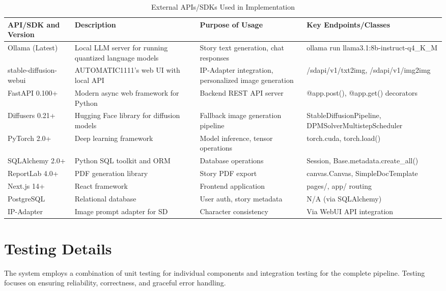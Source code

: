 \begin{table}[H]
\centering
\caption{External APIs/SDKs Used in Implementation}
\begin{tabular}{|p{3.5cm}|p{4.5cm}|p{3cm}|p{3cm}|}
\hline
\textbf{API/SDK and Version} & \textbf{Description} & \textbf{Purpose of Usage} & \textbf{Key Endpoints/Classes} \\ \hline
Ollama (Latest) & Local LLM server for running quantized language models & Story text generation, chat responses & ollama run llama3.1:8b-instruct-q4\_K\_M \\ \hline
stable-diffusion-webui & AUTOMATIC1111's web UI with local API & IP-Adapter integration, personalized image generation & /sdapi/v1/txt2img, /sdapi/v1/img2img \\ \hline
FastAPI 0.100+ & Modern async web framework for Python & Backend REST API server & @app.post(), @app.get() decorators \\ \hline
Diffusers 0.21+ & Hugging Face library for diffusion models & Fallback image generation pipeline & StableDiffusionPipeline, DPMSolverMultistepScheduler \\ \hline
PyTorch 2.0+ & Deep learning framework & Model inference, tensor operations & torch.cuda, torch.load() \\ \hline
SQLAlchemy 2.0+ & Python SQL toolkit and ORM & Database operations & Session, Base.metadata.create\_all() \\ \hline
ReportLab 4.0+ & PDF generation library & Story PDF export & canvas.Canvas, SimpleDocTemplate \\ \hline
Next.js 14+ & React framework & Frontend application & pages/, app/ routing \\ \hline
PostgreSQL & Relational database & User auth, story metadata & N/A (via SQLAlchemy) \\ \hline
IP-Adapter & Image prompt adapter for SD & Character consistency & Via WebUI API integration \\ \hline
\end{tabular}
\label{tab:apis_sdks}
\end{table}

\section{Testing Details}

The system employs a combination of unit testing for individual components and integration testing for the complete pipeline. Testing focuses on ensuring reliability, correctness, and graceful error handling.

